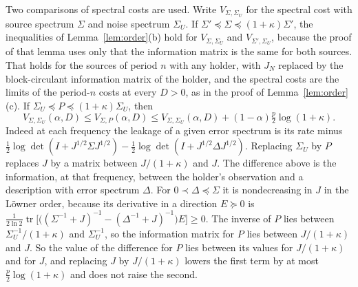\documentclass[11pt,onecolumn]{IEEEtran}
\newcommand{\tr}{\operatorname{tr}}
\begin{document}
Two comparisons of spectral costs are used. Write $V_{\Sigma,\Sigma_U}$
for the spectral cost with source spectrum $\Sigma$ and noise spectrum
$\Sigma_U$. If $\Sigma'\preceq\Sigma\preceq(1+\kappa)\Sigma'$, the
inequalities of Lemma~\ref{lem:order}(b) hold for
$V_{\Sigma,\Sigma_U}$ and $V_{\Sigma',\Sigma_U}$, because the proof of
that lemma uses only that the information matrix is the same for both
sources. That holds for the sources of period $n$ with any holder,
with $J_N$ replaced by the block-circulant information matrix of the
holder, and the spectral costs are the limits of the period-$n$ costs
at every $D>0$, as in the proof of Lemma~\ref{lem:order}(c).
If
$\Sigma_U\preceq P\preceq(1+\kappa)\Sigma_U$, then
\begin{equation}
V_{\Sigma,\Sigma_U}(\alpha,D)\le V_{\Sigma,P}(\alpha,D)\le V_{\Sigma,\Sigma_U}(\alpha,D)+(1-\alpha)\tfrac p2\log(1+\kappa).
\label{eq:noisecompare}
\end{equation}
Indeed at each frequency the leakage of a given error spectrum is its
rate minus
$\tfrac12\log\det(I+J^{1/2}\Sigma J^{1/2})-\tfrac12\log\det(I+J^{1/2}\Delta J^{1/2})$.
Replacing $\Sigma_U$ by $P$ replaces $J$ by a matrix between
$J/(1+\kappa)$ and $J$. The difference above is the information, at that frequency, between
the holder's observation and a description with error spectrum
$\Delta$. For $0\prec\Delta\preceq\Sigma$ it is nondecreasing in $J$ in the
L\"owner order, because its derivative in a direction $E\succeq0$ is
$\tfrac1{2\ln2}\tr\bigl[\bigl((\Sigma^{-1}+J)^{-1}-(\Delta^{-1}+J)^{-1}\bigr)E\bigr]\ge0$.
The inverse of $P$ lies between $\Sigma_U^{-1}/(1+\kappa)$ and
$\Sigma_U^{-1}$, so the information matrix for $P$ lies between
$J/(1+\kappa)$ and $J$. So the value of the difference for $P$ lies
between its values for
$J/(1+\kappa)$ and for $J$, and replacing $J$ by $J/(1+\kappa)$ lowers
the first term by at most $\tfrac p2\log(1+\kappa)$ and does not raise
the second.
\end{document}
